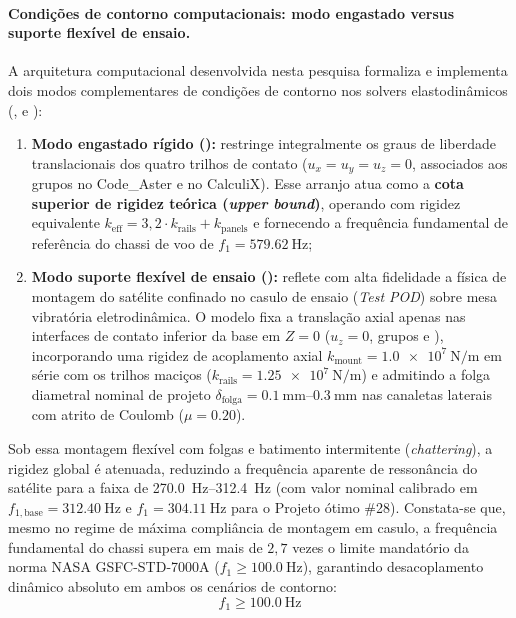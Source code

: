 \paragraph*{Condições de contorno computacionais: modo engastado versus suporte flexível de ensaio.}
A arquitetura computacional desenvolvida nesta pesquisa formaliza e implementa dois modos complementares de condições de contorno nos solvers elastodinâmicos (,  e ):
\begin{enumerate}
  \item \textbf{Modo engastado rígido ():} restringe integralmente os graus de liberdade translacionais dos quatro trilhos de contato ($u_x = u_y = u_z = 0$, associados aos grupos  no Code\_Aster e  no CalculiX). Esse arranjo atua como a \textbf{cota superior de rigidez teórica (\textit{upper bound})}, operando com rigidez equivalente $k_{\text{eff}} = 3{,}2 \cdot k_{\text{rails}} + k_{\text{panels}}$ e fornecendo a frequência fundamental de referência do chassi de voo de $f_1 = \SI{579.62}{\hertz}$;
  \item \textbf{Modo suporte flexível de ensaio ():} reflete com alta fidelidade a física de montagem do satélite confinado no casulo de ensaio (\textit{Test POD}) sobre mesa vibratória eletrodinâmica. O modelo fixa a translação axial apenas nas interfaces de contato inferior da base em $Z = 0$ ($u_z = 0$, grupos  e ), incorporando uma rigidez de acoplamento axial $k_{\text{mount}} = \SI{1.0e7}{\newton\per\metre}$ em série com os trilhos maciços ($k_{\text{rails}} = \SI{1.25e7}{\newton\per\metre}$) e admitindo a folga diametral nominal de projeto $\delta_{\text{folga}} = \SIrange{0.1}{0.3}{\milli\metre}$ nas canaletas laterais com atrito de Coulomb ($\mu = \num{0.20}$).
\end{enumerate}

Sob essa montagem flexível com folgas e batimento intermitente (\textit{chattering}), a rigidez global é atenuada, reduzindo a frequência aparente de ressonância do satélite para a faixa de \SIrange{270.0}{312.4}{\hertz} (com valor nominal calibrado em $f_{1,\text{base}} = \SI{312.40}{\hertz}$ e $f_1 = \SI{304.11}{\hertz}$ para o Projeto ótimo \#28). Constata-se que, mesmo no regime de máxima compliância de montagem em casulo, a frequência fundamental do chassi supera em mais de $2{,}7$ vezes o limite mandatório da norma NASA GSFC-STD-7000A ($f_1 \ge \SI{100.0}{\hertz}$), garantindo desacoplamento dinâmico absoluto em ambos os cenários de contorno:
\begin{equation}
  f_1 \ge \SI{100.0}{\hertz}
  \label{eq:f1min}
\end{equation}

